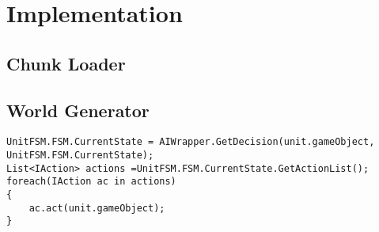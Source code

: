\chapter{Implementation}

\section{Chunk Loader}

\section{World Generator}

\begin{lstlisting}[caption = The Update() call from the turn manager., label=code:aicall, language=Csharp]
UnitFSM.FSM.CurrentState = AIWrapper.GetDecision(unit.gameObject, UnitFSM.FSM.CurrentState);
List<IAction> actions =UnitFSM.FSM.CurrentState.GetActionList();
foreach(IAction ac in actions)
{
	ac.act(unit.gameObject);
}
\end{lstlisting}